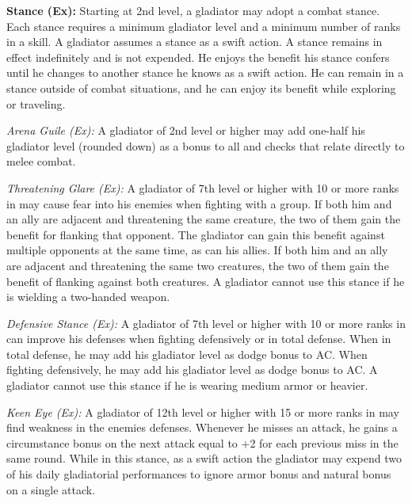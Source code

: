 \textbf{Stance (Ex):} Starting at 2nd level, a gladiator may adopt a combat stance. Each stance requires a minimum gladiator level and a minimum number of ranks in a skill. A gladiator assumes a stance as a swift action. A stance remains in effect indefinitely and is not expended. He enjoys the benefit his stance confers until he changes to another stance he knows as a swift action. He can remain in a stance outside of combat situations, and he can enjoy its benefit while exploring or traveling.

\textit{Arena Guile (Ex):} A gladiator of 2nd level or higher may add one-half his gladiator level (rounded down) as a bonus to all  and  checks that relate directly to melee combat.


\textit{Threatening Glare (Ex):} A gladiator of 7th level or higher with 10 or more ranks in  may cause fear into his enemies when fighting with a group. If both him and an ally are adjacent and threatening the same creature, the two of them gain the benefit for flanking that opponent. The gladiator can gain this benefit against multiple opponents at the same time, as can his allies. If both him and an ally are adjacent and threatening the same two creatures, the two of them gain the benefit of flanking against both creatures. A gladiator cannot use this stance if he is wielding a two-handed weapon.

\textit{Defensive Stance (Ex):} A gladiator of 7th level or higher with 10 or more ranks in  can improve his defenses when fighting defensively or in total defense. When in total defense, he may add \onehalf his gladiator level as dodge bonus to AC. When fighting defensively, he may add \onequarter his gladiator level as dodge bonus to AC. A gladiator cannot use this stance if he is wearing medium armor or heavier.

\textit{Keen Eye (Ex):} A gladiator of 12th level or higher with 15 or more ranks in  may find weakness in the enemies defenses. Whenever he misses an attack, he gains a circumstance bonus on the next attack equal to +2 for each previous miss in the same round. While in this stance, as a swift action the gladiator may expend two of his daily gladiatorial performances to ignore armor bonus and natural bonus on a single attack. 

